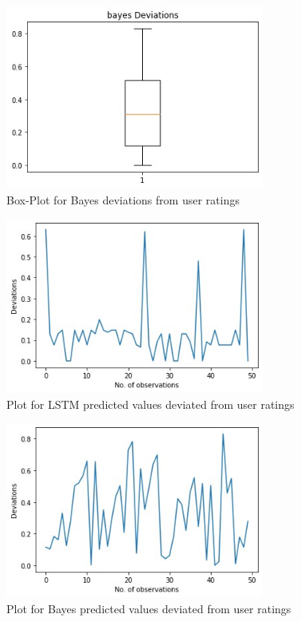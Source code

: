 \documentclass[sigplan,screen]{acmart}
\begin{document}
\begin{figure}[h]
    \includegraphics[width=8.5cm]{Bayes_boxPlot.jpeg}
    \caption{Box-Plot for Bayes deviations from user ratings}
    \label{fig:ss 1}
\end{figure}

\begin{figure}[h]
    \includegraphics[width=8.5cm]{LSTM_Dev.jpeg}
    \caption{Plot for LSTM predicted values deviated from user ratings}
    \label{fig:ss 1}
\end{figure}

\begin{figure}[h]
    \includegraphics[width=8.5cm]{Bayes_Dev.jpeg}
    \caption{Plot for Bayes predicted values deviated from user ratings}
    \label{fig:ss 1}
\end{figure}
\end{document}
